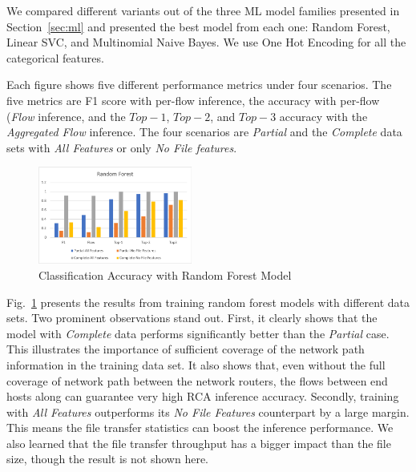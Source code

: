 We compared different variants out of the three ML model families presented in Section~\ref{sec:ml} and presented the best model from each one: Random Forest, Linear SVC, and Multinomial Naive Bayes.
We use One Hot Encoding for all the categorical features. 

Each figure shows five different performance metrics under four scenarios. The five metrics are F1 score with per-flow inference, the accuracy with per-flow ({\it Flow} inference, and the $Top-1$, $Top-2$, and $Top-3$ accuracy with
the {\it Aggregated Flow} inference. The four scenarios are {\it Partial} and the {\it Complete} data sets with {\it All Features} or only {\it No File features}.

\begin{figure}[!ht]
\begin{center}
\includegraphics[width=0.45\textwidth]{./figure/rf-accuracy}
\end{center}
\caption{Classification Accuracy with Random Forest Model}
\label{fig:dt}
\end{figure}

Fig.~\ref{fig:dt} presents the results from training random forest models with different data sets. Two prominent observations stand out. 
First, it clearly shows that the model with {\it Complete} data performs significantly better than the {\it Partial} case. This illustrates the importance of sufficient 
coverage of the network path information in the training data set. It also shows that, even without the full coverage of network path between the network routers, 
the flows between end hosts along can guarantee very high RCA inference accuracy.   
Secondly, training with {\it All Features} outperforms its {\it No File Features} counterpart by a large margin. This means the file transfer statistics can boost the inference performance.  
We also learned that the file transfer throughput has a bigger impact than the file size, though the result is not shown here. 


